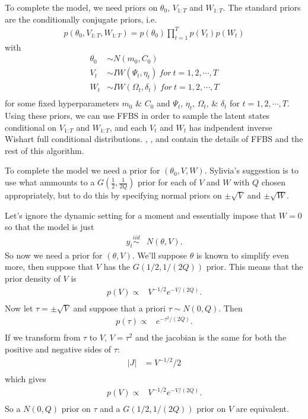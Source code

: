 \documentclass{article}\usepackage[]{graphicx}\usepackage[]{color}
\begin{document}
To complete the model, we need priors on $\theta_0$, $V_{1:T}$ and $W_{1:T}$. The standard priors are the conditionally conjugate priors, i.e. 
\begin{align*}
  p(\theta_0,V_{1:T},W_{1:T}) = p(\theta_0)\prod_{t=1}^Tp(V_t)p(W_t)
\end{align*}
with
\begin{align*}
  \theta_0 & \sim N(m_0,C_0) \\
  V_t & \sim IW(\Psi_t, \eta_t)\ for\ t=1,2,\cdots,T\\
  W_t & \sim IW(\Omega_t, \delta_t)\ for\ t=1,2,\cdots,T\\
\end{align*}
for some fixed hyperparameters $m_0$ \& $C_0$ and $\Psi_t$, $\eta_t$, $\Omega_t$, \& $\delta_t$ for $t=1,2,\cdots,T$. Using these priors, we can use FFBS in order to sample the latent states conditional on $V_{1:T}$ and $W_{1:T}$, and each $V_t$ and $W_t$ has indpendent inverse Wishart full conditional distributions. \citet{fruhwirth1994data}, \citet{carter1994gibbs}, and \citet{petris2009dynamic} contain the details of FFBS and the rest of this algorithm.

To complete the model we need a prior for $(\theta_0, V, W)$. Sylivia's suggestion is to use what ammounts to a $G\left(\frac{1}{2}, \frac{1}{2Q}\right)$ prior for each of $V$ and $W$ with $Q$ chosen appropriately, but to do this by specifying normal priors on $\pm \sqrt{V}$ and $\pm \sqrt{W}$.

Let's ignore the dynamic setting for a moment and essentially impose that $W=0$ so that the model is just
\begin{align*}
  y_t \stackrel{iid}{\sim} & N(\theta, V).
\end{align*}
So now we need a prior for $(\theta, V)$.  We'll suppose $\theta$ is known to simplify even more, then suppose that $V$ has the $G(1/2, 1/(2Q))$ prior. This means that the prior density of $V$ is
\begin{align*}
  p(V) \propto & V^{-1/2}e^{-V/(2Q)}.\\
\end{align*}
Now let $\tau = \pm \sqrt{V}$ and suppose that a priori $\tau \sim N(0,Q)$. Then
\begin{align*}
  p(\tau) \propto & e^{-\tau^2/(2Q)}.\\
\end{align*}
If we transform from $\tau$ to $V$, $V=\tau^2$ and the jacobian is the same for both the positive and negative sides of $\tau$:
\begin{align*}
  |J| & = V^{-1/2}/2\\
\end{align*}
which gives 
\begin{align*}
  p(V) \propto & V^{-1/2} e^{-V/(2Q)}.\\
\end{align*}
So a $N(0,Q)$ prior on $\tau$ and a $G(1/2, 1/(2Q))$ prior on $V$ are equivalent. 
\end{document}
